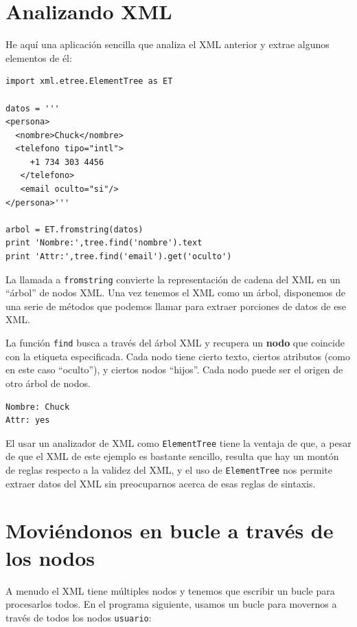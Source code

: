 \section{Analizando XML}

He aquí una aplicación sencilla que analiza el XML anterior
y extrae algunos elementos de él:

\beforeverb
\begin{verbatim}
import xml.etree.ElementTree as ET

datos = '''
<persona>
  <nombre>Chuck</nombre>
  <telefono tipo="intl">
     +1 734 303 4456
   </telefono>
   <email oculto="si"/>
</persona>'''

arbol = ET.fromstring(datos)
print 'Nombre:',tree.find('nombre').text
print 'Attr:',tree.find('email').get('oculto')
\end{verbatim}
\afterverb
%
La llamada a {\tt fromstring} convierte la representación de cadena
del XML en un ``árbol'' de nodos XML. Una vez tenemos el XML
como un árbol, disponemos de una serie de métodos que podemos llamar para
extraer porciones de datos de ese XML.

La función {\tt find} busca a través del árbol XML
y recupera un {\bf nodo} que coincide con la etiqueta especificada.
Cada nodo tiene cierto texto, ciertos atributos (como en este caso ``oculto''), y
ciertos nodos ``hijos''. Cada nodo puede ser el origen de otro árbol de nodos.

\beforeverb
\begin{verbatim}
Nombre: Chuck
Attr: yes
\end{verbatim}
\afterverb
%
El usar un analizador de XML como {\tt ElementTree} tiene la ventaja
de que, a pesar de que el XML de este ejemplo es bastante sencillo, resulta
que hay un montón de reglas respecto a la validez del XML, y el uso de
{\tt ElementTree} nos permite extraer datos del XML sin
preocuparnos acerca de esas reglas de sintaxis.

\section{Moviéndonos en bucle a través de los nodos}

A menudo el XML tiene múltiples nodos y tenemos que escribir un bucle
para procesarlos todos. En el programa siguiente,
usamos un bucle para movernos a través de todos los nodos {\tt usuario}:

